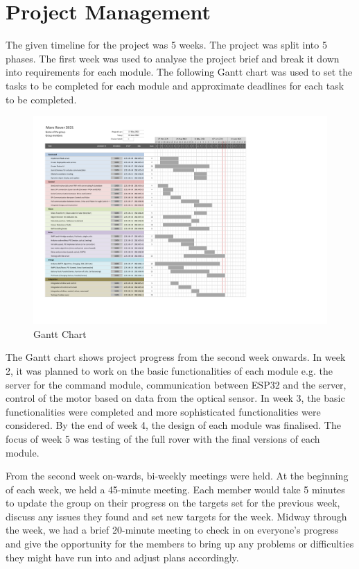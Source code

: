 \documentclass[10pt,twoside]{article}
\begin{document}


\newpage

\tableofcontents

\newpage
\section{Project Management}

The given timeline for the project was 5 weeks. The project was split into 5 phases. The first week was used to analyse the project brief and break it down into requirements for each module. The following Gantt chart was used to set the tasks to be completed for each module and approximate deadlines for each task to be completed.

\begin{figure}[hbt]
    \centering
    \includegraphics[scale = 0.6,trim={1cm 3cm 8cm 0},clip]{GanttChart.pdf}
    \caption{Gantt Chart}
    \label{fig:GanttChart}
\end{figure}

The Gantt chart shows project progress from the second week onwards. In week 2, it was planned to work on the basic functionalities of each module e.g. the server for the command module, communication between ESP32 and the server, control of the motor based on data from the optical sensor. In week 3, the basic functionalities were completed and more sophisticated functionalities were considered. By the end of week 4, the design of each module was finalised. The focus of week 5 was testing of the full rover with the final versions of each module. 
 
From the second week on-wards, bi-weekly meetings were held. At the beginning of each week, we held a 45-minute meeting. Each member would take 5 minutes to update the group on their progress on the targets set for the previous week, discuss any issues they found and set new targets for the week. Midway through the week, we had a brief 20-minute meeting to check in on everyone’s progress and give the opportunity for the members to bring up any problems or difficulties they might have run into and adjust plans accordingly.
 
\end{document}
